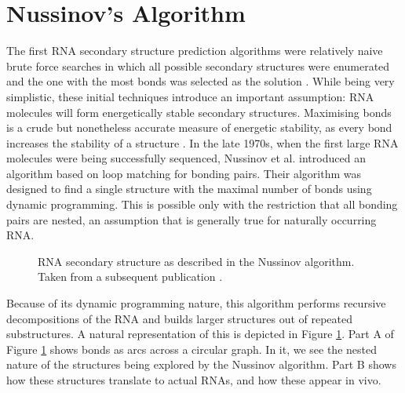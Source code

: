 \documentclass[12pt, a4paper]{article}
\begin{document}
\section*{Nussinov's Algorithm} The first RNA secondary structure prediction algorithms were relatively naive brute force searches in which all possible secondary structures were enumerated and the one with
the most bonds was selected as the solution \cite{nussinov1978algorithms}. While being very simplistic,
these initial techniques introduce an important assumption: RNA molecules will
form energetically stable secondary structures. Maximising bonds is a crude but
nonetheless accurate measure of energetic stability, as every bond increases the
stability of a structure \cite{nussinov1978algorithms}. In the late 1970s, when the first large RNA molecules
were being successfully sequenced, Nussinov et al. \cite{nussinov1978algorithms} introduced an algorithm
based on loop matching for bonding pairs. Their algorithm was designed to find a
single structure with the maximal number of bonds using dynamic programming. This is possible only with the restriction that all bonding pairs are nested, an assumption that is generally true for naturally occurring RNA.

\begin{figure}
\begin{center}
\end{center}
\caption{RNA secondary structure as described in the Nussinov algorithm.
Taken from a subsequent publication \cite{nussinov1980fast}.}
\label{figure1}
\end{figure}


Because of its dynamic programming nature, this algorithm performs recursive decompositions of the RNA and builds
larger structures out of repeated substructures. A natural representation of this is
depicted in Figure \ref{figure1}. Part A of Figure \ref{figure1} shows bonds as arcs across a circular
graph. In it, we see the nested nature of the structures being explored by the
Nussinov algorithm. Part B shows how these structures translate to actual RNAs,
and how these appear in vivo.
\end{document}
